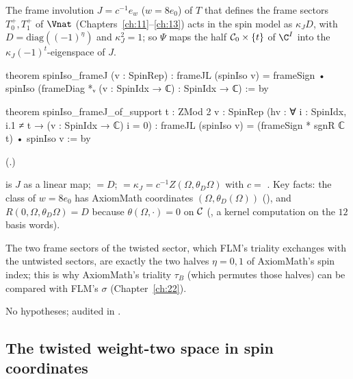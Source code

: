 \begin{theorem}\label{ch21:thm:frame}
The frame involution $J=c^{-1}e_w$ ($w=8e_0$) of $T$ that defines the frame sectors $T_0^+,T_1^+$ of
$\Vnat$ (Chapters~\ref{ch:11}--\ref{ch:13}) acts in the spin model as $\kappa_J D$, with
$D=\mathrm{diag}((-1)^\eta)$ and $\kappa_J^2=1$; so $\Psi$ maps the half $\mathcal{C}_0\times\{t\}$ of $\C^I$
into the $\kappa_J(-1)^t$-eigenspace of $J$.
\end{theorem}
\begin{leancode}
theorem spinIso_frameJ (v : SpinRep) :
    frameJL (spinIso v) = frameSign • spinIso (frameDiag *ᵥ (v : SpinIdx → ℂ) : SpinIdx → ℂ) := by
\end{leancode}
\begin{leancode}
theorem spinIso_frameJ_of_support {t : ZMod 2} {v : SpinRep}
    (hv : ∀ i : SpinIdx, i.1 ≠ t → (v : SpinIdx → ℂ) i = 0) :
    frameJL (spinIso v) = (frameSign * sgnR ℂ t) • spinIso v := by
\end{leancode}
(.)
\begin{dictionary}
 is $J$ as a linear map;  $=D$;  $=\kappa_J=c^{-1}Z(\Omega,\theta_D\Omega)$
with $c=$ .  Key facts: the class of $w=8e_0$ has AxiomMath coordinates
$(\Omega,\theta_D(\Omega))$ (), and $R(0,\Omega,\theta_D\Omega)=D$ because
$\theta(\Omega,\cdot)=0$ on $\mathcal{C}$ (, a kernel computation on the $12$ basis
words).
\end{dictionary}
\begin{physics}
The two frame sectors of the twisted sector, which FLM's triality exchanges with the untwisted
sectors, are exactly the two halves $\eta=0,1$ of AxiomMath's spin index; this is why AxiomMath's
triality $\tau_B$ (which permutes those halves) can be compared with FLM's $\sigma$ (Chapter~\ref{ch:22}).
\end{physics}
\begin{status}
No hypotheses; audited in .
\end{status}

\subsection{The twisted weight-two space in spin coordinates}

